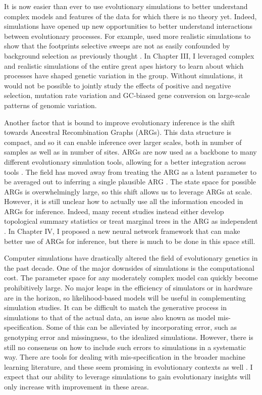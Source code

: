 %
It is now easier than ever to use evolutionary simulations to better understand complex models and features of the data for which there is no theory yet.
Indeed, simulations have opened up new opportunities to better understand interactions between evolutionary processes.
For example, \citet{schrider_background_2020} used more realistic simulations to show that the footprints selective sweeps are not as easily confounded by background selection as previously thought \citep{andolfatto_adaptive_2001}.
In Chapter III, I leveraged complex and realistic simulations of the entire great apes history to learn about which processes have shaped genetic variation in the group.
Without simulations, it would not be possible to jointly study the effects of positive and negative selection, mutation rate variation and GC-biased gene conversion on large-scale patterns of genomic variation.

Another factor that is bound to improve evolutionary inference is the shift towards Ancestral Recombination Graphs (ARGs).
This data structure is compact, and so it can enable inference over larger scales, both in number of samples as well as in number of sites.
ARGs are now used as a backbone to many different evolutionary simulation tools, allowing for a better integration across tools \citep{haller_tree-sequence_2019, kelleher_efficient_2016-1}.
The field has moved away from treating the ARG as a latent parameter to be averaged out \citep{griffiths_ancestral_1996, nielsen_estimation_2000}
to inferring a single plausible ARG \citep{kelleher_inferring_2019, speidel_method_2019}.
The state space for possible ARGs is overwhelmingly large, so  this shift allows us to leverage ARGs at scale.
However, it is still unclear how to actually use all the information encoded in ARGs for inference.
Indeed, many recent studies instead either develop topological summary statistics or treat marginal trees in the ARG as independent \citep{hejase_deep-learning_2022, fan_likelihood-based_2023}.
In Chapter IV, I proposed a new neural network framework that can make better use of ARGs for inference,
but there is much to be done in this space still.

Computer simulations have drastically altered the field of evolutionary genetics in the past decade.
One of the major downsides of simulations is the computational cost.
The parameter space for any moderately complex model can quickly become prohibitively large.
No major leaps in the efficiency of simulators or in hardware are in the horizon, 
so likelihood-based models will be useful in complementing simulation studies.
It can be difficult to match the generative process in simulations to that of the actual data,
an issue also known as model mis-specification.
Some of this can be alleviated by incorporating error, such as genotyping error and missingness, to the idealized simulations.
However, there is still no consensus on how to include such errors to simulations in a systematic way.
There are tools for dealing with mis-specification in the broader machine learning literature,
and these seem promising in evolutionary contexts as well \citep{mo_domain-adaptive_2023}.
I expect that our ability to leverage simulations to gain evolutionary insights will only increase with improvement in these areas.
